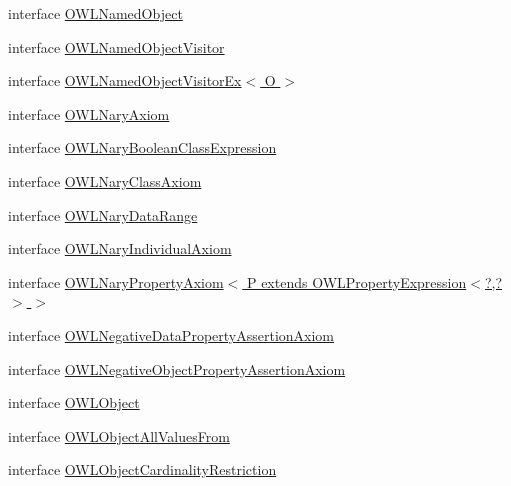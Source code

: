 \begin{DoxyCompactItemize}
interface \hyperlink{interfaceorg_1_1semanticweb_1_1owlapi_1_1model_1_1_o_w_l_named_object}{O\-W\-L\-Named\-Object}
\item 
interface \hyperlink{interfaceorg_1_1semanticweb_1_1owlapi_1_1model_1_1_o_w_l_named_object_visitor}{O\-W\-L\-Named\-Object\-Visitor}
\item 
interface \hyperlink{interfaceorg_1_1semanticweb_1_1owlapi_1_1model_1_1_o_w_l_named_object_visitor_ex_3_01_o_01_4}{O\-W\-L\-Named\-Object\-Visitor\-Ex$<$ O $>$}
\item 
interface \hyperlink{interfaceorg_1_1semanticweb_1_1owlapi_1_1model_1_1_o_w_l_nary_axiom}{O\-W\-L\-Nary\-Axiom}
\item 
interface \hyperlink{interfaceorg_1_1semanticweb_1_1owlapi_1_1model_1_1_o_w_l_nary_boolean_class_expression}{O\-W\-L\-Nary\-Boolean\-Class\-Expression}
\item 
interface \hyperlink{interfaceorg_1_1semanticweb_1_1owlapi_1_1model_1_1_o_w_l_nary_class_axiom}{O\-W\-L\-Nary\-Class\-Axiom}
\item 
interface \hyperlink{interfaceorg_1_1semanticweb_1_1owlapi_1_1model_1_1_o_w_l_nary_data_range}{O\-W\-L\-Nary\-Data\-Range}
\item 
interface \hyperlink{interfaceorg_1_1semanticweb_1_1owlapi_1_1model_1_1_o_w_l_nary_individual_axiom}{O\-W\-L\-Nary\-Individual\-Axiom}
\item 
interface \hyperlink{interfaceorg_1_1semanticweb_1_1owlapi_1_1model_1_1_o_w_l_nary_property_axiom_3_01_p_01extends_01ea844dc139c8e4dddb91655b52ab9e06}{O\-W\-L\-Nary\-Property\-Axiom$<$ P extends O\-W\-L\-Property\-Expression$<$?,?$>$ $>$}
\item 
interface \hyperlink{interfaceorg_1_1semanticweb_1_1owlapi_1_1model_1_1_o_w_l_negative_data_property_assertion_axiom}{O\-W\-L\-Negative\-Data\-Property\-Assertion\-Axiom}
\item 
interface \hyperlink{interfaceorg_1_1semanticweb_1_1owlapi_1_1model_1_1_o_w_l_negative_object_property_assertion_axiom}{O\-W\-L\-Negative\-Object\-Property\-Assertion\-Axiom}
\item 
interface \hyperlink{interfaceorg_1_1semanticweb_1_1owlapi_1_1model_1_1_o_w_l_object}{O\-W\-L\-Object}
\item 
interface \hyperlink{interfaceorg_1_1semanticweb_1_1owlapi_1_1model_1_1_o_w_l_object_all_values_from}{O\-W\-L\-Object\-All\-Values\-From}
\item 
interface \hyperlink{interfaceorg_1_1semanticweb_1_1owlapi_1_1model_1_1_o_w_l_object_cardinality_restriction}{O\-W\-L\-Object\-Cardinality\-Restriction}

\end{DoxyCompactItemize}
